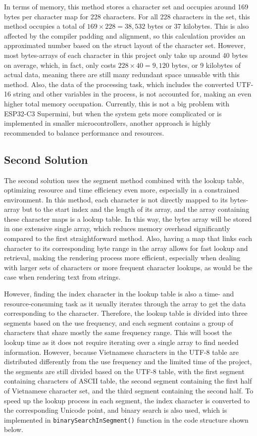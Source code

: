 \documentclass[../Main.tex]{subfiles}
\begin{document}
In terms of memory, this method stores a character set and occupies around 169 bytes per character map for 228 characters. For all 228 characters in the set, this method occupies a total of \(169 \times 228 = 38,532\) bytes or 37 kilobytes. This is also affected by the compiler padding and alignment, so this calculation provides an approximated number based on the struct layout of the character set. However, most bytes-arrays of each character in this project only take up around 40 bytes on average, which, in fact, only costs \(228 \times 40 = 9,120\) bytes, or 9 kilobytes of actual data, meaning there are still many redundant space unusable with this method. Also, the data of the processing task, which includes the converted UTF-16 string and other variables in the process, is not accounted for, making an even higher total memory occupation. Currently, this is not a big problem with ESP32-C3 Supermini, but when the system gets more complicated or is implemented in smaller microcontrollers, another approach is highly recommended to balance performance and resources.

\subsection{Second Solution}
The second solution uses the segment method combined with the lookup table, optimizing resource and time efficiency even more, especially in a constrained environment. In this method, each character is not directly mapped to its bytes-array but to the start index and the length of its array, and the array containing these character maps is a lookup table. In this way, the bytes array will be stored in one extensive single array, which reduces memory overhead significantly compared to the first straightforward method. Also, having a map that links each character to its corresponding byte range in the array allows for fast lookup and retrieval, making the rendering process more efficient, especially when dealing with larger sets of characters or more frequent character lookups, as would be the case when rendering text from strings.

However, finding the index character in the lookup table is also a time- and resource-consuming task as it usually iterates through the array to get the data corresponding to the character. Therefore, the lookup table is divided into three segments based on the use frequency, and each segment contains a group of characters that share mostly the same frequency range. This will boost the lookup time as it does not require iterating over a single array to find needed information. However, because Vietnamese characters in the UTF-8 table are distributed differently from the use frequency and the limited time of the project, the segments are still divided based on the UTF-8 table, with the first segment containing characters of ASCII table, the second segment containing the first half of Vietnamese character set, and the third segment containing the second half. To speed up the lookup process in each segment, the index character is converted to the corresponding Unicode point, and binary search is also used, which is implemented in \verb|binarySearchInSegment()| function in the code structure shown below.
\end{document}
